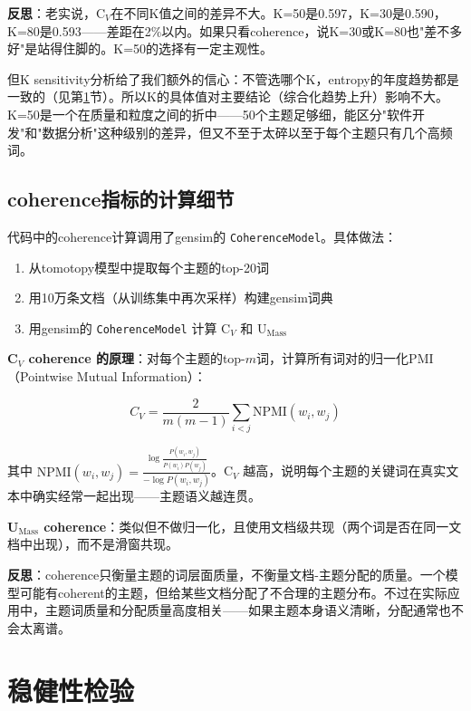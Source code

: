 \documentclass[12pt,a4paper]{ctexart}
\begin{document}
\textbf{反思}：老实说，C$_V$在不同K值之间的差异不大。K=50是0.597，K=30是0.590，K=80是0.593——差距在2\%以内。如果只看coherence，说K=30或K=80也"差不多好"是站得住脚的。K=50的选择有一定主观性。

但K sensitivity分析给了我们额外的信心：不管选哪个K，entropy的年度趋势都是一致的（见第\ref{sec:robustness}节）。所以K的具体值对主要结论（综合化趋势上升）影响不大。K=50是一个在质量和粒度之间的折中——50个主题足够细，能区分"软件开发"和"数据分析"这种级别的差异，但又不至于太碎以至于每个主题只有几个高频词。

\subsection{coherence指标的计算细节}

代码中的coherence计算调用了gensim的 \texttt{CoherenceModel}。具体做法：

\begin{enumerate}
\item 从tomotopy模型中提取每个主题的top-20词
\item 用10万条文档（从训练集中再次采样）构建gensim词典
\item 用gensim的 \texttt{CoherenceModel} 计算 C$_V$ 和 U$_\text{Mass}$
\end{enumerate}

\textbf{C$_V$ coherence 的原理}：对每个主题的top-$m$词，计算所有词对的归一化PMI（Pointwise Mutual Information）：

\begin{equation}
C_V = \frac{2}{m(m-1)} \sum_{i<j} \text{NPMI}(w_i, w_j)
\end{equation}

其中 $\text{NPMI}(w_i, w_j) = \frac{\log \frac{P(w_i, w_j)}{P(w_i)P(w_j)}}{-\log P(w_i, w_j)}$。C$_V$ 越高，说明每个主题的关键词在真实文本中确实经常一起出现——主题语义越连贯。

\textbf{U$_\text{Mass}$ coherence}：类似但不做归一化，且使用文档级共现（两个词是否在同一文档中出现），而不是滑窗共现。

\textbf{反思}：coherence只衡量主题的词层面质量，不衡量文档-主题分配的质量。一个模型可能有coherent的主题，但给某些文档分配了不合理的主题分布。不过在实际应用中，主题词质量和分配质量高度相关——如果主题本身语义清晰，分配通常也不会太离谱。


\section{稳健性检验}
\label{sec:robustness}
\end{document}
